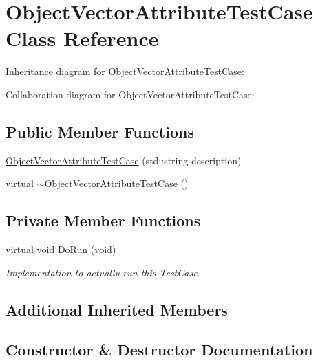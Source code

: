\hypertarget{classObjectVectorAttributeTestCase}{}\section{Object\+Vector\+Attribute\+Test\+Case Class Reference}
\label{classObjectVectorAttributeTestCase}


Inheritance diagram for Object\+Vector\+Attribute\+Test\+Case\+:


Collaboration diagram for Object\+Vector\+Attribute\+Test\+Case\+:
\subsection*{Public Member Functions}
\begin{DoxyCompactItemize}
\item 
\hyperlink{classObjectVectorAttributeTestCase_a2079ed97f8e9dfb1c2771baa4b66f002}{Object\+Vector\+Attribute\+Test\+Case} (std\+::string description)
\item 
virtual \hyperlink{classObjectVectorAttributeTestCase_aaebbd736bdf60ad6d7b39df73a8cb65d}{$\sim$\+Object\+Vector\+Attribute\+Test\+Case} ()
\end{DoxyCompactItemize}
\subsection*{Private Member Functions}
\begin{DoxyCompactItemize}
\item 
virtual void \hyperlink{classObjectVectorAttributeTestCase_a1303d466cdadc093ddb0e9884439ef00}{Do\+Run} (void)
\begin{DoxyCompactList}\small\item\em Implementation to actually run this Test\+Case. \end{DoxyCompactList}\end{DoxyCompactItemize}
\subsection*{Additional Inherited Members}


\subsection{Constructor \& Destructor Documentation}
